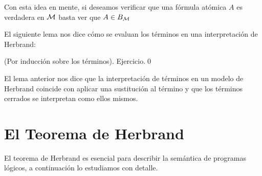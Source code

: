 \documentclass[11pt,letterpaper]{article}
\begin{document}
Con esta idea en mente, si deseamos verificar que una f\'ormula at\'omica 
$A$ es verdadera en $\mathcal{M}$ basta ver que  $A\in B_{\mathcal{M}}$ 

El siguiente lema nos dice c\'omo se evaluan los t\'erminos en una 
interpretaci\'on de Herbrand:

\proof (Por inducci\'on sobre los t\'erminos). Ejercicio.\qed


\espc

El lema anterior nos dice que la interpretaci\'on de t\'erminos en un
modelo de Herbrand coincide con aplicar una sustituci\'on al t\'ermino
y que los t\'erminos cerrados se interpretan como ellos mismos.



\section{El Teorema de Herbrand}


El teorema de Herbrand es esencial para describir la sem\'antica de
programas l\'ogicos, a continuaci\'on lo estudiamos con detalle.
\end{document}
